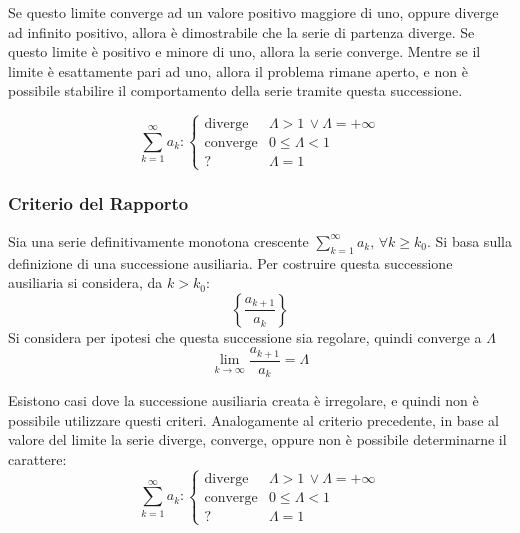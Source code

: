 \documentclass{article}
\numberwithin{equation}{subsection}
\begin{document}
Se questo limite converge ad un valore positivo maggiore di uno, oppure diverge ad infinito positivo, allora è dimostrabile che la serie di partenza diverge. 
Se questo limite è positivo e minore di uno, allora la serie converge. Mentre se il limite è esattamente pari ad uno, allora il problema rimane aperto, e non è possibile stabilire il comportamento della serie tramite questa successione. 

\begin{equation}
    \displaystyle\sum_{k=1}^\infty a_k:\begin{cases}
        \text{diverge}&\Lambda > 1\,\lor\Lambda=+\infty\\
        \text{converge}&0\leq\Lambda<1\\
        ?&\Lambda=1
    \end{cases}
\end{equation}

\subsubsection{Criterio del Rapporto}

Sia una serie definitivamente monotona crescente $\sum_{k=1}^\infty a_k,\,\forall k\geq k_0$. 
Si basa sulla definizione di una successione ausiliaria. Per costruire questa successione ausiliaria si considera, da $k>k_0$:
\begin{equation*}
    \displaystyle\left\{\frac{a_{k+1}}{a_k}\right\}
\end{equation*}
Si considera per ipotesi che questa successione sia regolare, quindi converge a $\Lambda$
\begin{equation*}
    \lim_{k\to\infty}\displaystyle\frac{a_{k+1}}{a_k}=\Lambda
\end{equation*}

Esistono casi dove la successione ausiliaria creata è irregolare, e quindi non è possibile utilizzare questi criteri. 
Analogamente al criterio precedente, in base al valore del limite la serie diverge, converge, oppure non è possibile determinarne il carattere:
\begin{equation}
    \displaystyle\sum_{k=1}^\infty a_k:\begin{cases}
        \text{diverge}&\Lambda > 1\,\lor\Lambda=+\infty\\
        \text{converge}&0\leq\Lambda<1\\
        ?&\Lambda=1
    \end{cases}
\end{equation}
\end{document}
